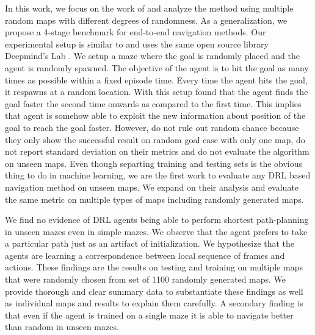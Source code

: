 
In this work, we focus on the work of \cite{MiPaViICLR2017} and analyze the method using multiple random maps with different degrees of randomness. As a generalization, we propose a 4-stage benchmark for end-to-end navigation methods.
Our experimental setup is similar to \cite{MiPaViICLR2017} and uses the same open source library Deepmind's Lab \cite{BeLeTeARXIV2016}.
We setup a maze where the goal is randomly placed and the agent is randomly spawned.
The objective of the agent is to hit the goal as many times as possible within a fixed episode time.
Every time the agent hits the goal, it respawns at a random location.
With this setup \cite{MiPaViICLR2017} found that the agent finds the goal faster the second time onwards as compared to the first time.
This implies that agent is somehow able to exploit the new information about position of the goal to reach the goal faster.
However, \cite{MiPaViICLR2017} do not rule out random chance because they only show the successful result on random goal case with only one map, do not report standard deviation on their metrics and do not evaluate the algorithm on unseen maps.
Even though separting training and testing sets is the obvious thing to do in machine learning, we are the first work to evaluate any DRL based navigation method on unseen maps.
We expand on their analysis and evaluate the same metric on multiple types of maps including randomly generated maps.

We find no evidence of DRL agents being able to perform shortest path-planning in unseen mazes even in simple mazes.
We observe that the agent prefers to take a particular path just as an artifact of initialization.
We hypothesize that the agents are learning a correspondence between local sequence of frames and actions.
These findings are the results on testing and training on multiple maps that were randomly chosen from set of 1100 randomly generated maps.
We provide thorough and clear summary data to substantiate these findings as well as individual maps and results to explain them carefully.
A secondary finding is that even if the agent is trained on a single maze it is able to navigate better than random in unseen mazes.

